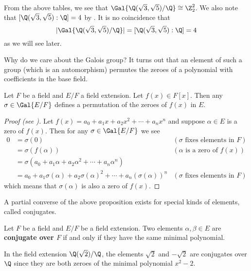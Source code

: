 \begin{example}
    From the above tables, we see that $\Gal{\Q(\sqrt3,\sqrt5)/\Q} \cong \Z_2^2$. We also note that $[\Q(\sqrt3,\sqrt5):\Q] = 4$ by . It is no coincidence that
    \[
        |\Gal{\Q(\sqrt3,\sqrt5)/\Q}| = [\Q(\sqrt3,\sqrt5):\Q] = 4
    \]
    as we will see later.
\end{example}

Why do we care about the Galois group? It turns out that an element of such a group (which is an automorphism) permutes the zeroes of a polynomial with coefficients in the base field.

\begin{proposition}\label{prop-galois-field-automorphism-permutes-zeroes-of-polynomial}
    Let $F$ be a field and $E/F$ a field extension. Let $f(x) \in F[x]$. Then any $\sigma \in \Gal{E/F}$ defines a permutation of the zeroes of $f(x)$ in $E$.
\end{proposition}
\begin{proof}[Proof (see {\cite[Proposition 23.5]{judson_beezer_2022}})]
    Let $f(x) = a_0 + a_1x + a_2x^2 + \cdots + a_nx^n$ and suppose $\alpha \in E$ is a zero of $f(x)$. Then for any $\sigma \in \Gal{E/F}$ we see
    \begin{align*}
        0 &= \sigma(0) & (\sigma \text{ fixes elements in }F)\\
        &= \sigma(f(\alpha)) & (\alpha \text{ is a zero of }f(x))\\
        &= \sigma(a_0 + a_1\alpha + a_2\alpha^2 + \cdots + a_n\alpha^n)\\
        &= a_0 + a_1\sigma(\alpha) + a_2\sigma(\alpha)^2 + \cdots + a_n(\sigma(\alpha))^n & (\sigma \text{ fixes elements in }F)
    \end{align*}
    which means that $\sigma(\alpha)$ is also a zero of $f(x)$.
\end{proof}

A partial converse of the above proposition exists for special kinds of elements, called conjugates.

\begin{definition}
    Let $F$ be a field and $E/F$ be a field extension. Two elements $\alpha,\beta \in E$ are \textbf{conjugate over $F$} if and only if they have the same minimal polynomial.
\end{definition}

\begin{example}
    In the field extension $\Q(\sqrt2)/\Q$, the elements $\sqrt2$ and $-\sqrt2$ are conjugates over $\Q$ since they are both zeroes of the minimal polynomial $x^2 - 2$.
\end{example}

